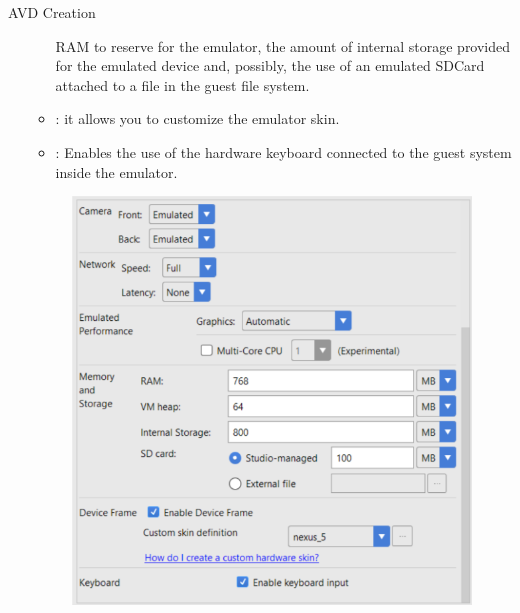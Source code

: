 \documentclass{beamer}
\begin{document}
\begin{frame}[allowframebreaks]{AVD Creation}
\begin{enumerate}
\begin{itemize}
        RAM to reserve for the emulator, the amount of internal storage provided
        for the emulated device and, possibly, the use of an emulated SDCard
        attached to a file in the guest file system.
        \item {}: it allows you to customize the emulator skin. 
        \item {}: Enables the use of the hardware keyboard connected
        to the guest system inside the emulator. 
      \end{itemize}
      \begin{figure}
      \includegraphics[width=0.65\linewidth]{figures/avd-5.png}
      \end{figure}
    \end{enumerate}
  \end{frame}
\end{document}
